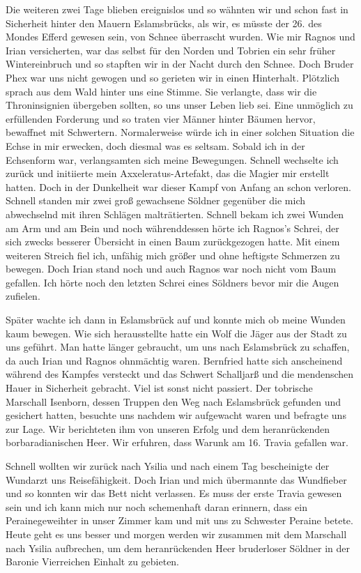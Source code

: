 Die weiteren zwei Tage blieben ereignislos und so wähnten wir und schon fast in Sicherheit hinter den Mauern Eslamsbrücks, als wir, es müsste der 26. des Mondes Efferd gewesen sein, von Schnee überrascht wurden. Wie mir Ragnos und Irian versicherten, war das selbst für den Norden und Tobrien ein sehr früher Wintereinbruch und so stapften wir in der Nacht durch den Schnee. Doch Bruder Phex war uns nicht gewogen und so gerieten wir in einen Hinterhalt. Plötzlich sprach aus dem Wald hinter uns eine Stimme. Sie verlangte, dass wir die Throninsignien übergeben sollten, so uns unser Leben lieb sei. Eine unmöglich zu erfüllenden Forderung und so traten vier Männer hinter Bäumen hervor, bewaffnet mit Schwertern. Normalerweise würde ich in einer solchen Situation die Echse in mir erwecken, doch diesmal was es seltsam. Sobald ich in der Echsenform war, verlangsamten sich meine Bewegungen. Schnell wechselte ich zurück und initiierte mein Axxeleratus-Artefakt, das die Magier mir erstellt hatten. Doch in der Dunkelheit war dieser Kampf von Anfang an schon verloren. Schnell standen mir zwei groß gewachsene Söldner gegenüber die mich abwechselnd mit ihren Schlägen malträtierten. Schnell bekam ich zwei Wunden am Arm und am Bein und noch währenddessen hörte ich Ragnos's Schrei, der sich zwecks besserer Übersicht in einen Baum zurückgezogen hatte. Mit einem weiteren Streich fiel ich, unfähig mich größer und ohne heftigste Schmerzen zu bewegen. Doch Irian stand noch und auch Ragnos war noch nicht vom Baum gefallen. Ich hörte noch den letzten Schrei eines Söldners bevor mir die Augen zufielen.

Später wachte ich dann in Eslamsbrück auf und konnte mich ob meine Wunden kaum bewegen. Wie sich herausstellte hatte ein Wolf die Jäger aus der Stadt zu uns geführt. Man hatte länger gebraucht, um uns nach Eslamsbrück zu schaffen, da auch Irian und Ragnos ohnmächtig waren. Bernfried hatte sich anscheinend während des Kampfes versteckt und das Schwert Schalljarß und die mendenschen Hauer in Sicherheit gebracht. Viel ist sonst nicht passiert. Der tobrische Marschall Isenborn, dessen Truppen den Weg nach Eslamsbrück gefunden und gesichert hatten, besuchte uns nachdem wir aufgewacht waren und befragte uns zur Lage. Wir berichteten ihm von unseren Erfolg und dem heranrückenden borbaradianischen Heer. Wir erfuhren, dass Warunk am 16. Travia gefallen war.

Schnell wollten wir zurück nach Ysilia und nach einem Tag bescheinigte der Wundarzt uns Reisefähigkeit. Doch Irian und mich übermannte das Wundfieber und so konnten wir das Bett nicht verlassen. Es muss der erste Travia gewesen sein und ich kann mich nur noch schemenhaft daran erinnern, dass ein Perainegeweihter in unser Zimmer kam und mit uns zu Schwester Peraine betete. Heute geht es uns besser und morgen werden wir zusammen mit dem Marschall nach Ysilia aufbrechen, um dem heranrückenden Heer bruderloser Söldner in der Baronie Vierreichen Einhalt zu gebieten.

